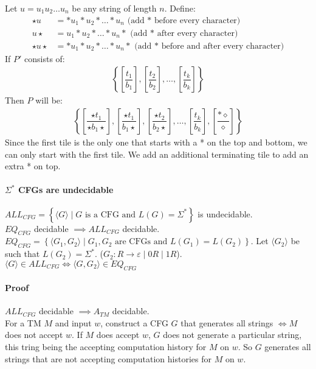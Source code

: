 \documentclass[12 pt]{article}
\begin{document}
Let $u = u_1 u_2 \ldots u_n$ be any string of length $n$. Define:
\begin{align*}
  \star u & = *u_1 * u_2 * \ldots * u_n \text{ (add * before every character)}
  \\ u \star & = u_1 * u_2 * \ldots * u_n * \text{ (add * after every character)}
  \\ \star u \star & = *u_1 * u_2 * \ldots * u_n * \text{ (add *
                     before and after every character)}
\end{align*}
If $P'$ consists of:
\begin{align*}
  \left\{\left[\dfrac{t_1}{b_1}\right],\left[\dfrac{t_2}{b_2}\right], \ldots, \left[\dfrac{t_k}{b_k}\right]\right\}
\end{align*}
Then $P$ will be:
\begin{align*}
  \left\{\left[\dfrac{\star t_1}{\star b_1\star}\right], \left[\dfrac{\star t_1}{b_1 \star}\right],\left[\dfrac{\star t_2}{b_2\star}\right], \ldots, \left[\dfrac{t_k}{b_k}\right], \left[\dfrac{* \diamond}{\diamond}\right]\right\}
\end{align*}
Since the first tile is the only one that starts with a * on the top
and bottom, we can only start with the first tile. We add an additional
terminating tile to add an extra * on top.
\paragraph{$\Sigma^*$ CFGs are undecidable}
$ALL_{CFG} = \left\{\langle G \rangle \mid G \text{ is a CFG and }L(G)
  = \Sigma^*\right\}$ is undecidable.
\\ $EQ_{CFG}$ decidable $\implies ALL_{CFG}$ decidable.
\\ $EQ_{CFG} = \left\{\langle G_1,G_2 \rangle \mid G_1, G_2 \text{ are
  CFGs and }L(G_1)=L(G_2)\right\}$. Let $\langle G_2 \rangle$ be such
that $L(G_2) = \Sigma^*$. ($G_2: R \to \varepsilon \mid 0R \mid 1R$).
\\ $\langle G \rangle \in ALL_{CFG} \iff \langle G,G_2 \rangle \in
EQ_{CFG}$
\paragraph{Proof} $ALL_{CFG}$ decidable $\implies A_{TM}$ decidable.
\\ For a TM $M$ and input $w$, construct a CFG $G$ that generates all
strings $\iff M$ does not accept $w$. If $M$ does accept $w$, $G$ does
not generate a particular string, this tring being the accepting
computation history for $M$ on $w$. So $G$ generates all strings that
are not accepting computation histories for $M$ on $w$.
\end{document}
